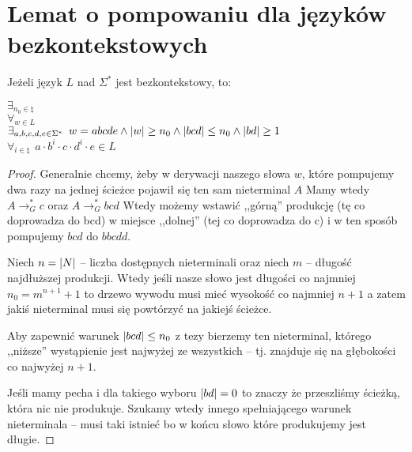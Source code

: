 \section{Lemat o pompowaniu dla języków bezkontekstowych}

\begin{theorem}
	Jeżeli język \(L\) nad \(\Sigma^*\) jest bezkontekstowy, to:

	\( \exists_{n_0 \in \natural} \) \\
	\( \forall_{w \in L} \) \\
	\( \exists_{a, b, c, d, e \in \Sigma^*} \hspace{5pt} w = abcde \land \card{w} \geq n_0 \land |bcd| \leq n_0 \land |bd| \geq 1 \) \\
	\( \forall_{i \in \natural} \hspace{5pt} a \cdot b^{i} \cdot c \cdot d^{i} \cdot e \in L\)
\end{theorem}
\begin{proof}
	Generalnie chcemy, żeby w derywacji naszego słowa \( w \), które pompujemy dwa razy na jednej ścieżce pojawił się ten sam nieterminal \( A \) Mamy wtedy \( A \rightarrow_G^* c\) oraz \( A \rightarrow_G^* bcd \) Wtedy możemy wstawić ,,górną'' produkcję (tę co doprowadza do bcd) w miejsce ,,dolnej'' (tej co doprowadza do c) i w ten sposób pompujemy \( bcd \) do  \( bbcdd \).


	Niech \( n = \card{N} \) -- liczba dostępnych nieterminali oraz niech \( m \) -- długość najdłuższej produkcji.
	Wtedy jeśli nasze słowo jest długości co najmniej \( n_0 = m^{n + 1} + 1 \) to drzewo wywodu musi mieć wysokość co najmniej \( n + 1 \) a zatem jakiś nieterminal musi się powtórzyć na jakiejś ścieżce.

	Aby zapewnić warunek \( \card{bcd} \leq n_0 \) z tezy bierzemy ten nieterminal, którego ,,niższe'' wystąpienie jest najwyżej ze wszystkich -- tj. znajduje się na głębokości co najwyżej \( n + 1 \).

	Jeśli mamy pecha i dla takiego wyboru \( \card{bd} = 0 \) to znaczy że przeszliśmy ścieżką, która nic nie produkuje.
	Szukamy wtedy innego spełniającego warunek nieterminala -- musi taki istnieć bo w końcu słowo które produkujemy jest długie.

\end{proof}
